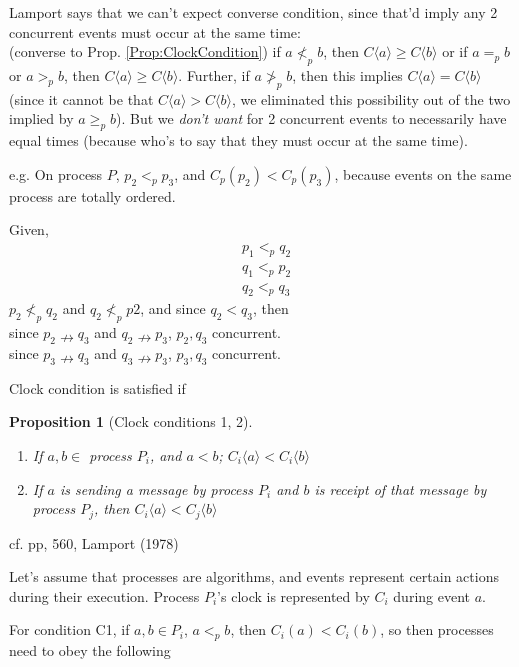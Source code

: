 \documentclass[10pt]{amsart}
\newtheorem{proposition}{Proposition}
\begin{document}
\begin{multicols*}{2}
Lamport says that we can't expect converse condition, since that'd imply any 2 concurrent events must occur at the same time: \\
(converse to Prop. \ref{Prop:ClockCondition}) if $a \not<_p b$, then $C\langle a \rangle \geq C\langle b \rangle$ or if $a =_p b$ or $a >_p b$, then $C\langle a \rangle \geq C\langle b\rangle$. Further, if $a \not>_p b$, then this implies $C\langle a \rangle = C\langle b \rangle$ (since it cannot be that $C\langle a \rangle > C\langle b \rangle$, we eliminated this possibility out of the two implied by $a \geq_p b$). But we \emph{don't want} for 2 concurrent events to necessarily have equal times (because  who's to say that they must occur at the same time).

e.g. On process $P$, $p_2 <_p p_3$, and $C_p(p_2) < C_p(p_3)$, because events on the same process are totally ordered.

Given,
\[
\begin{aligned}
& p_1 <_p q_2 \\
& q_1 <_p p_2 \\
& q_2 <_p q_3
\end{aligned}
\]
$p_2 \not<_p q_2$ and $q_2 \not<_p p2$, and since $q_2 < q_3$, then \\
since $p_2 \nrightarrow q_3$ and $q_2 \nrightarrow p_3$, $p_2, q_3$ concurrent. \\
since $p_3 \nrightarrow q_3$ and $q_3 \nrightarrow p_3$, $p_3, q_3$ concurrent.

Clock condition is satisfied if  
\begin{proposition}[Clock conditions 1, 2] 
\begin{enumerate}
	\item[C1] If $a,b \in $ process $P_i$, and $a<b$; $C_i\langle a \rangle < C_i \langle b \rangle$ 
	\item[C2] If $a$ is sending a message by process $P_i$ and $b$ is receipt of that message by process $P_j$, then $C_i\langle a \rangle < C_j \langle b \rangle$
\end{enumerate}
\end{proposition} 
cf. pp, 560, Lamport (1978) \cite{Lamp1978}

Let's assume that processes are algorithms, and events represent certain actions during their execution. Process $P_i$'s clock is represented by $C_i$ during event $a$. 

For condition C1, if $a,b \in P_i$, $a<_p b$, then $C_i(a) < C_i(b)$, so then processes need to obey the following


\end{multicols*}
\end{document}

